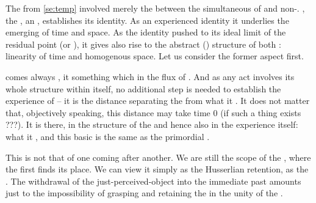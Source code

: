 The  from \ref{se:temp} involved merely the
 between the simultaneous  of  and
non-.  , the  ,
 an , establishes its identity. As an experienced
identity it underlies the emerging  of time and space. As the
identity pushed to its ideal limit of the residual point (or ),
it gives also rise to the abstract () structure of both :
linearity of time and homogenous space. Let us consider the former aspect first.

\label{sub:time}
%
\pa {} comes always , it 
something which   in the flux of
. And as any act involves its whole structure within itself, no
additional step is needed to establish the experience of  -- it
is the distance separating the  from what it
. It does not matter that, objectively speaking, this distance
may take time 0 (if such a thing exists ???). It is there, in the structure of
the  and hence also in the experience itself:
  what it , and this basic
 is the same as the primordial {}.

This  is not that of one  coming
after another. We are still  the scope of the \hoa, where the first
 finds its place. We can view it simply as the Husserlian retention,
as the . The withdrawal of the
just-perceived-object into the immediate past amounts just to the impossibility
of  grasping and retaining the  in the unity of the
. 

